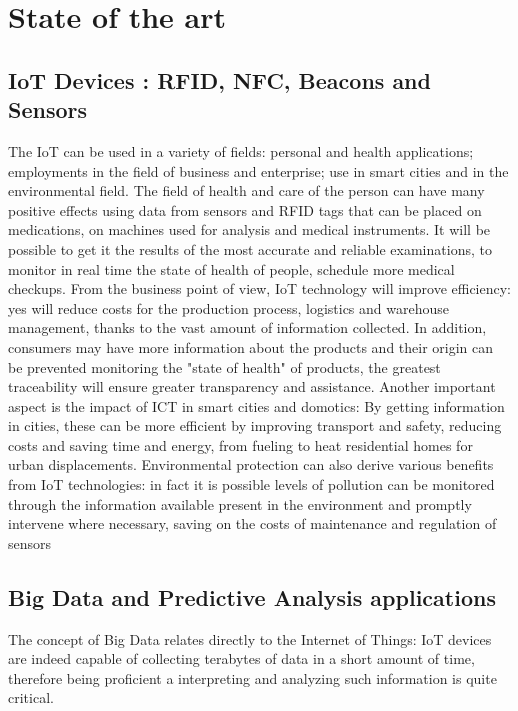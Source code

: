 \chead{}
\chapter{State of the art}

\section{IoT Devices : RFID, NFC, Beacons and Sensors}

The IoT can be used in a variety of fields: personal and health applications; employments in the field of business and enterprise; use in smart cities and in the environmental field. The field of health and care of the person can have many positive effects using data from sensors and RFID tags that can be placed on medications, on machines used for analysis and medical instruments. It will be possible to get it the results of the most accurate and reliable examinations, to monitor in real time the state of health of people, schedule more medical checkups. From the business point of view, IoT technology will improve efficiency: yes will reduce costs for the production process, logistics and warehouse management, thanks to the vast amount of information collected. In addition, consumers may have more information about the products and their origin can be prevented monitoring the "state of health" of products, the greatest traceability will ensure greater transparency and assistance. Another important aspect is the impact of ICT in smart cities and domotics: By getting information in cities, these can be more efficient by improving transport and safety, reducing costs and saving time and energy, from fueling to heat residential homes for urban displacements. Environmental protection can also derive various benefits from IoT technologies: in fact it is possible levels of pollution can be monitored through the information available present in the environment and promptly intervene where necessary, saving on the costs of maintenance and regulation of sensors

\section{Big Data and Predictive Analysis applications}

The concept of Big Data relates directly to the Internet of Things: IoT devices are indeed capable of collecting terabytes of data in a short amount of time, therefore being proficient a interpreting and analyzing such information is quite critical.

